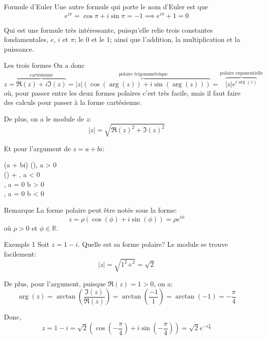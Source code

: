 \documentclass{article}
\begin{document}
\begin{parag}{Formule d'Euler}
    Une autre formule qui porte le nom d'Euler est que
    \[e^{i\pi} = \cos\pi + i\sin\pi = -1 \implies e^{i\pi} + 1 = 0\]

    Qui est une formule très intéressante, puisqu'elle relie trois constantes fondamentales, $e$, $i$ et $\pi$; le 0 et le 1; ainsi que l'addition, la multiplication et la puissance.
\end{parag}

\begin{parag}{Les trois formes}
    On a donc
    \[z = \overbrace{\Re\left(z\right) + i\Im\left(z\right)}^{\text{cartésienne}} = \overbrace{\left|z\right|\left(\cos\left(\arg\left(z\right)\right) + i\sin\left(\arg\left(z\right)\right)\right)}^{\text{polaire trigonométrique}} = \overbrace{\left|z\right|e^{i\arg\left(z\right)}}^{\text{polaire exponentielle}}\]
    où, pour passer entre les deux formes polaires c'est très facile, mais il faut faire des calculs pour passer à la forme cartésienne.

    De plus, on a le module de $z$:
    \[\left|z\right| = \sqrt{\Re\left(z\right)^2 + \Im\left(z\right)^2}\]

    Et pour l'argument de $z = a + bi$:
    \begin{functionbypart}{\arg\left(a + bi\right)}
        \arctan\left(\right), \mathspace {} a > 0 \\
        \arctan\left(\right) + \pi, \mathspace {} a < 0 \\
        , \mathspace {} a = 0  b > 0 \\
        , \mathspace {} a = 0  b < 0
    \end{functionbypart}

    \begin{subparag}{Remarque}
        La forme polaire peut être notée sous la forme:
        \[z = \rho\left(\cos\left(\phi\right) + i\sin\left(\phi\right)\right) = \rho e^{i\phi}\]
        où $\rho > 0$ et $\phi \in \mathbb{R}$.
    \end{subparag}
\end{parag}

\begin{parag}{Exemple 1}
    Soit $z = 1 - i$. Quelle est sa forme polaire? Le module se trouve facilement:
    \[\left|z\right| = \sqrt{1^2 + ^2} = \sqrt{2}\]

    De plus, pour l'argument, puisque $\Re\left(z\right) = 1 > 0$, on a:
    \[\arg\left(z\right) = \arctan\left(\frac{\Im\left(z\right)}{\Re\left(z\right)}\right) = \arctan\left(\frac{-1}{1}\right) = \arctan\left(-1\right) = -\frac{\pi}{4}\]

    Donc,
    \[z = 1 - i = \sqrt{2}\left(\cos\left(-\frac{\pi}{4}\right) + i\sin\left(-\frac{\pi}{4}\right)\right) = \sqrt{2}e^{-i \frac{\pi}{4}}\]

\end{parag}
\end{document}
